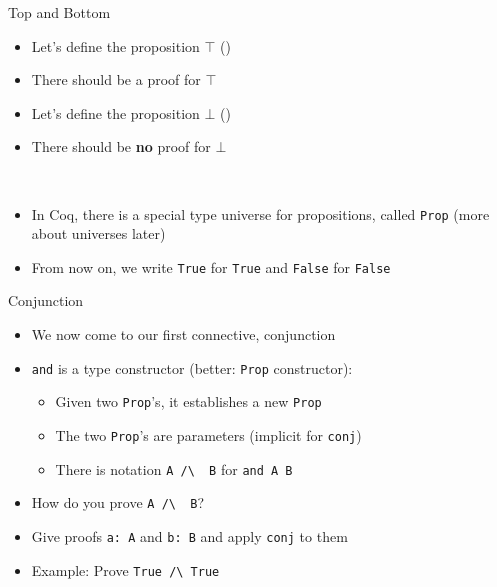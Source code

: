 \begin{frame}[fragile]{Top and Bottom}
\begin{itemize}
  \item Let's define the proposition $⊤$ ()
  \item There should be a proof for $⊤$


  \pause

  \item Let's define the proposition $⊥$ ()
  \item There should be \textbf{no} proof for $⊥$

  ~\\[1em]

  \pause

  \item In Coq, there is a special type universe for propositions, called \lstinline|Prop| (more about universes later)
  \item From now on, we write \lstinline|True| for \lstinline[language=coqorig]|True| and \lstinline|False| for \lstinline[language=coqorig]|False|
\end{itemize}
\end{frame}

\begin{frame}[fragile]{Conjunction}
\begin{itemize}
  \item We now come to our first connective, conjunction


  \pause

  \item \lstinline|and| is a type constructor (better: \lstinline|Prop| constructor):
    \begin{itemize}
      \item Given two \lstinline|Prop|'s, it establishes a new \lstinline|Prop|
      \item The two \lstinline|Prop|'s are parameters (implicit for \lstinline|conj|)
      \item There is notation \lstinline|A /\  B| for \lstinline|and A B|
    \end{itemize}

  \pause

  \item How do you prove \lstinline|A /\  B|?

  \pause

  \item Give proofs \lstinline|a: A| and \lstinline|b: B| and apply \lstinline|conj| to them

  \pause

  \item Example: Prove \lstinline|True /\ True|

\end{itemize}
\end{frame}

